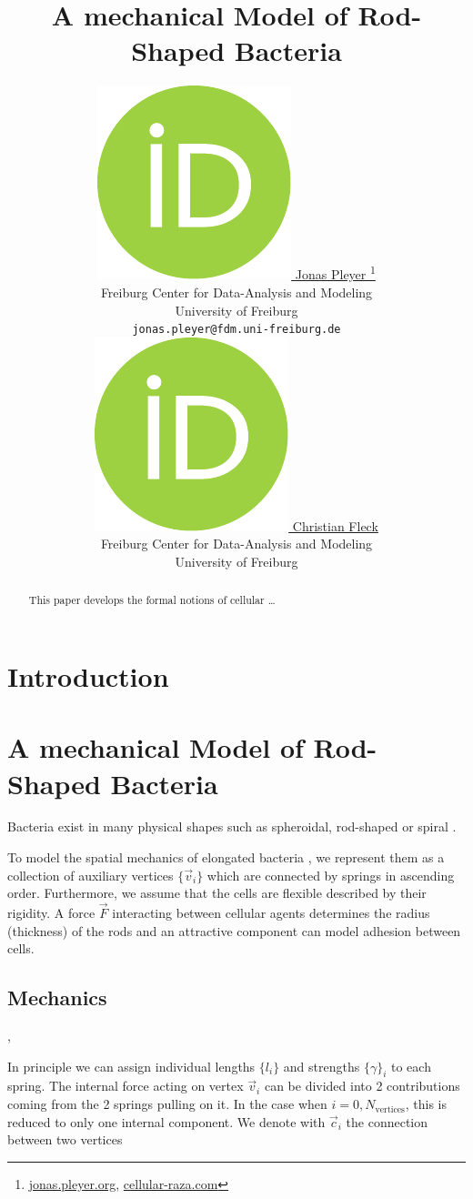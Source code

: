 \documentclass{article}
\title{
    A mechanical Model of Rod-Shaped Bacteria
}
\author{
    \href{https://orcid.org/0009-0001-0613-7978}{
        \includegraphics[scale=0.06]{orcid.pdf}
        \hspace{1mm}Jonas Pleyer
    }
    \thanks{
        \href{https://jonas.pleyer.org}{jonas.pleyer.org},
        \href{https://cellular-raza.com}{cellular-raza.com}
    }\\
	Freiburg Center for Data-Analysis and Modeling\\
	University of Freiburg\\
	\texttt{jonas.pleyer@fdm.uni-freiburg.de} \\
	\And
	\href{https://orcid.org/0000-0002-6371-4495}{
        \includegraphics[scale=0.06]{orcid.pdf}
        \hspace{1mm}Christian Fleck
    }\\
	Freiburg Center for Data-Analysis and Modeling\\
	University of Freiburg
}
\begin{document}
\maketitle

\begin{abstract}
    This paper develops the formal notions of cellular \dots
\end{abstract}


\section{Introduction}
\label{section:introduction}

\section{A mechanical Model of Rod-Shaped Bacteria}
\label{section:mechanical-model-rod-shaped-bacteria}

Bacteria exist in many physical shapes such as spheroidal, rod-shaped or spiral
\cite{Zapun2008,Young2006}.

To model the spatial mechanics of elongated bacteria \cite{Billaudeau2017}, we represent them as a
collection of auxiliary vertices $\{\vec{v}_i\}$ which are connected by springs in
ascending order.
Furthermore, we assume that the cells are flexible described by their rigidity.
A force $\vec{F}$ interacting between cellular agents determines the radius (thickness) of the
rods and an attractive component can model adhesion between cells.

\subsection{Mechanics}

\cite{Chatterjee1988},\cite{Ursell2014}

In principle we can assign individual lengths $\{l_i\}$ and strengths $\{\gamma\}_i$ to each spring.
The internal force acting on vertex $\vec{v}_i$ can be divided into 2 contributions coming
from the 2 springs pulling on it.
In the case when $i=0,N_\text{vertices}$, this is reduced to only one internal component.
We denote with $\vec{c}_{i}$ the connection between two vertices
\end{document}
